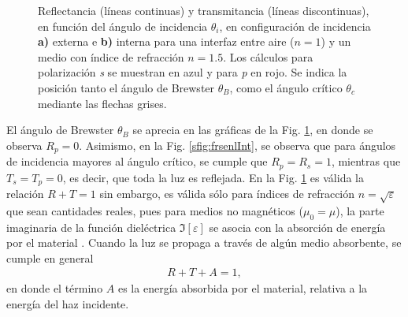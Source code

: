 \begin{figure}[h!]
\begin{subfigure}{.43\textwidth}
	\end{subfigure}\vspace*{-.7em}
	\caption{  Reflectancia (líneas continuas) y transmitancia (líneas discontinuas), en función del ángulo de incidencia $\theta_i$, en configuración de incidencia \textbf{a)} externa e \textbf{b)} interna para una interfaz entre  aire ($n=1$) y un medio con índice de refracción $n = 1.5$. Los cálculos para polarización  \emph{s} se muestran  en azul y  para \emph{p} en rojo. Se indica la posición tanto el ángulo de Brewster $\theta_B$, como el ángulo crítico $\theta_c$ mediante las flechas grises.}	\label{fig:frsnel}	
	\end{figure}	
%

El ángulo de Brewster $\theta_B$ se aprecia en las gráficas de la Fig. \ref{fig:frsnel}, en donde se observa $R_p = 0$. Asimismo, en la Fig. \ref{sfig:frsenlInt}, se observa que para ángulos de incidencia mayores al ángulo crítico, se cumple que $R_p = R_s = 1$, mientras que $T_s = T_p = 0$, es decir, que toda la luz es reflejada. En la Fig. \ref{fig:frsnel} es válida la relación $R + T = 1$ sin embargo, es válida sólo para índices de refracción $n = \sqrt{\varepsilon}$ que sean cantidades reales, pues para medios no magnéticos ($\mu_0 = \mu$), la parte imaginaria de la función dieléctrica $\Im[\varepsilon]$ se asocia con la absorción de energía por el material \cite{ibach2003solid}. Cuando la luz se propaga a través de algún medio absorbente, se cumple en general 
	\begin{align*}
	R + T + A = 1,
	\end{align*}
en donde el término $A$ es la energía absorbida por el material, relativa a la energía del haz incidente.
	




